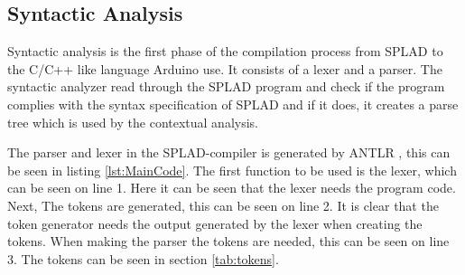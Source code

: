 \subsection{Syntactic Analysis}
Syntactic analysis is the first phase of the compilation process from SPLAD to the C/C++ like language Arduino use. It consists of a lexer and a parser. The syntactic analyzer read through the SPLAD program and check if the program complies with the syntax specification of SPLAD and if it does, it creates a parse tree which is used by the contextual analysis.

The parser and lexer in the SPLAD-compiler is generated by ANTLR \citep{ANTLR}, this can be seen in listing \ref{lst:MainCode}. The first function to be used is the lexer, which can be seen on line 1. Here it can be seen that the lexer needs the program code. Next, The tokens are generated, this can be seen on line 2. It is clear that the token generator needs the output generated by the lexer when creating the tokens. When making the parser the tokens are needed, this can be seen on line 3. The tokens can be seen in section \ref{tab:tokens}.

